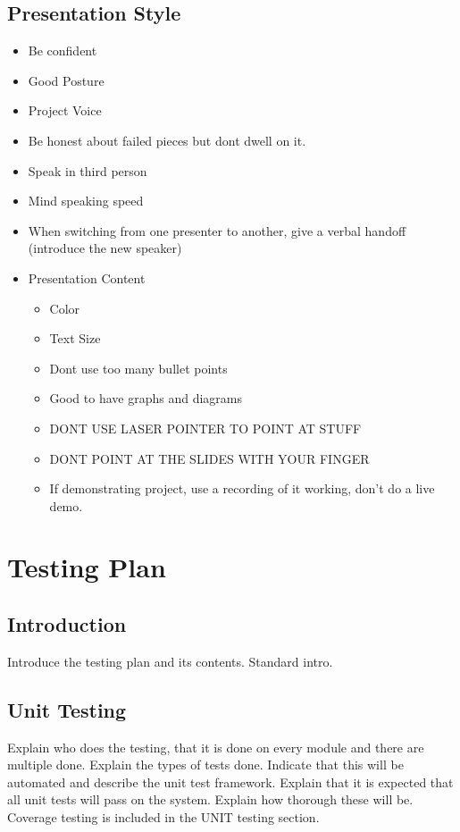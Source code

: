 \documentclass{report}
\begin{document}
\subsection{Presentation Style}
\begin{itemize}
\item Be confident
\item Good Posture
\item Project Voice
\item Be honest about failed pieces but dont dwell on it.
\item Speak in third person
\item Mind speaking speed
\item When switching from one presenter to another, give a verbal handoff (introduce the new speaker)
\item Presentation Content
	\begin{itemize}
	\item Color
	\item Text Size
	\item Dont use too many bullet points
	\item Good to have graphs and diagrams
	\item DONT USE LASER POINTER TO POINT AT STUFF
	\item DONT POINT AT THE SLIDES WITH YOUR FINGER
	\item If demonstrating project, use a recording of it working, don't do a live demo.
	\end{itemize}
\end{itemize}

\section{Testing Plan}
\subsection{Introduction}
	Introduce the testing plan and its contents. Standard intro.
\subsection{Unit Testing}
	Explain who does the testing, that it is done on every module and there are multiple done. Explain the types of tests done. Indicate that this will be automated and describe the unit test framework. Explain that it is expected that all unit tests will pass on the system. Explain how thorough these will be. Coverage testing is included in the UNIT testing section.
\end{document}
